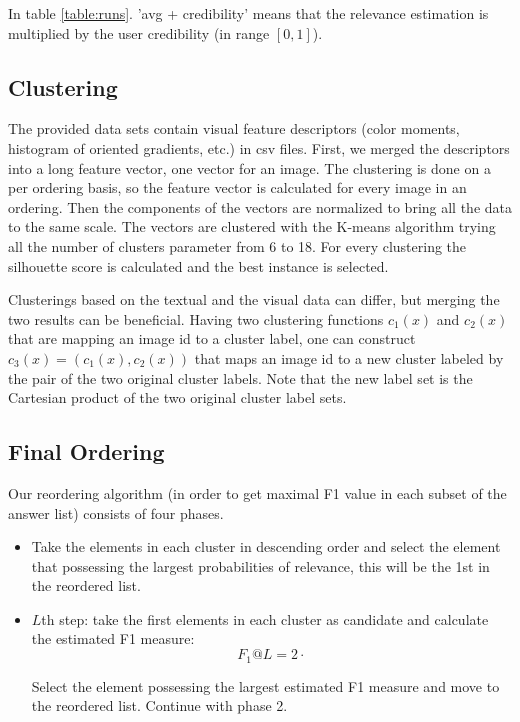 \documentclass{acm_proc_article-me}
\begin{document}
In table \ref{table:runs}. 'avg + credibility' means that the relevance estimation is multiplied by the user credibility (in range $[0,1]$). 

\subsection{Clustering}
\label{sec:clust}

The provided data sets contain visual feature descriptors (color moments, histogram of oriented gradients, etc.) in csv files. First, we merged the descriptors into a long feature vector, one vector for an image. The clustering is done on a per ordering basis, so the feature vector is calculated for every image in an ordering. Then the components of the vectors are normalized to bring all the data to the same scale. The vectors are clustered with the K-means algorithm trying all the number of clusters parameter from 6 to 18. For every clustering the silhouette score \cite{rousseeuw1987silhouettes} is calculated and the best instance is selected.

Clusterings based on the textual and the visual data can differ, but merging the two results can be beneficial. Having two clustering functions $c_1(x)$ and $c_2(x)$ that are mapping an image id to a cluster label, one can construct $c_3(x) = (c_1(x), c_2(x))$ that maps an image id to a new cluster labeled by the pair of the two original cluster labels. Note that the new label set is the Cartesian product of the two original cluster label sets.

\subsection{Final Ordering}

Our reordering algorithm (in order to get maximal F1 value in each subset of the answer list) consists of four phases.

\begin{itemize}
\item Take the elements in each cluster in descending order and select the element that possessing the largest probabilities of relevance, this will be the 1st in the reordered list.
\item $L$th step: take the first elements in each cluster as candidate and calculate the estimated F1 measure: $$F_1@L = 2 \cdot $$


Select the element possessing the largest estimated F1 measure and move to the reordered list.
Continue with phase 2.
\end{itemize}
\end{document}
